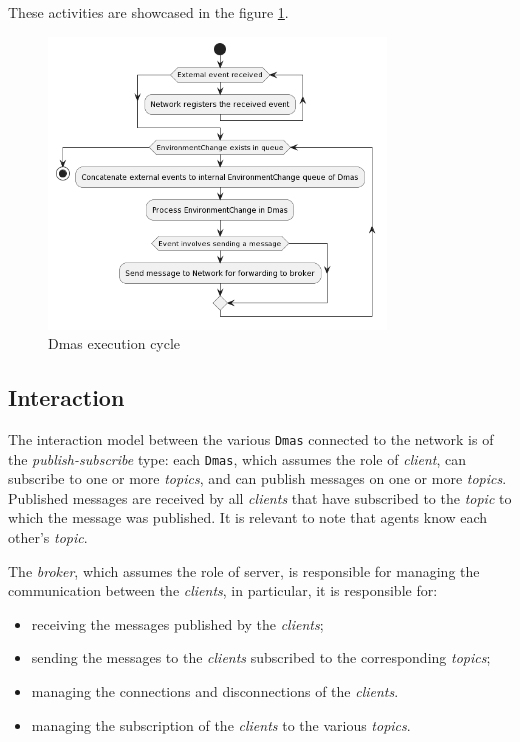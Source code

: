 These activities are showcased in the figure \ref{fig:execution}.

\begin{figure}[ht]
    \centering
    \includegraphics[width=0.8\textwidth]{figures/activity-applychanges.png}
    \caption{Dmas execution cycle}
    \label{fig:execution}
\end{figure}

\subsection{Interaction}
The interaction model between the various \texttt{Dmas} connected to the network is of the \textit{publish-subscribe} type: each \texttt{Dmas}, which assumes the role of \textit{client}, can subscribe to one or more \textit{topics}, and can publish messages on one or more \textit{topics}.
Published messages are received by all \textit{clients} that have subscribed to the \textit{topic} to which the message was published.
It is relevant to note that agents know each other's \textit{topic}.


The \textit{broker}, which assumes the role of server, is responsible for managing the communication between the \textit{clients}, in particular, it is responsible for:
\begin{itemize}
    \item receiving the messages published by the \textit{clients};
    \item sending the messages to the \textit{clients} subscribed to the corresponding \textit{topics};
    \item managing the connections and disconnections of the \textit{clients}.
    \item managing the subscription of the \textit{clients} to the various \textit{topics}.
\end{itemize}

